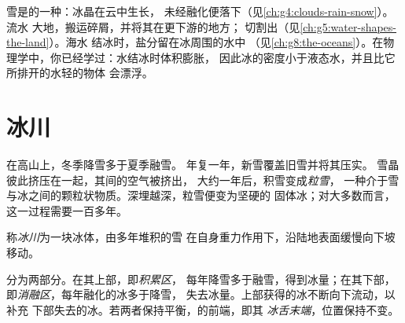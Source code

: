 \begin{recall}
雪是的一种：冰晶在云中生长，
未经融化便落下（见\cref{ch:g4:clouds-rain-snow}）。流水
大地，搬运碎屑，并将其在更下游的地方；
切割出（见\cref{ch:g5:water-shapes-the-land}）。海水
结冰时，盐分留在冰周围的水中
（见\cref{ch:g8:the-oceans}）。在物理学中，你已经学过：水结冰时体积膨胀，
因此冰的密度小于液态水，并且比它所排开的水轻的物体
会漂浮。
\end{recall}

\section{冰川}

在高山上，冬季降雪多于夏季融雪。
年复一年，新雪覆盖旧雪并将其压实。
雪晶彼此挤压在一起，其间的空气被挤出，
大约一年后，积雪变成\emph{粒雪}，
一种介于雪与冰之间的颗粒状物质。深埋越深，粒雪便变为坚硬的
固体冰；对大多数而言，这一过程需要一百多年。

\begin{definition}[冰川]\label{def:g8:ice-on-earth:glacier}
称\emph{冰川}为一块冰体，由多年堆积的雪
在自身重力作用下，沿陆地表面缓慢向下坡移动。
\end{definition}

分为两部分。在其上部，即\emph{积累区}，
每年降雪多于融雪，得到冰量；在其下部，
即\emph{消融区}，每年融化的冰多于降雪，
失去冰量。上部获得的冰不断向下流动，以补充
下部失去的冰。若两者保持平衡，的前端，即其
\emph{冰舌末端}，位置保持不变。


